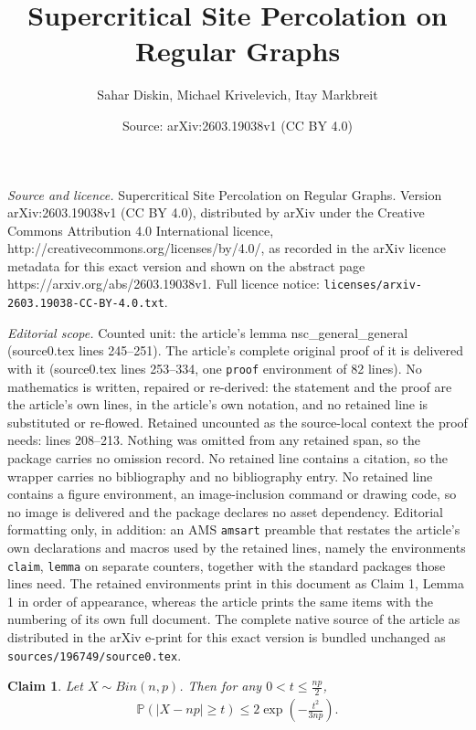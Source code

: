 \documentclass[10pt,a4paper]{amsart}
\title{\vspace{-1.5cm}Supercritical Site Percolation on Regular Graphs}
\author{Sahar Diskin, Michael Krivelevich, Itay Markbreit}
\date{Source: arXiv:2603.19038v1 (CC BY 4.0)}
\newtheorem{claim}{Claim}
\begin{document}
\maketitle

\noindent\emph{Source and licence.} \vspace{-1.5cm}Supercritical Site Percolation on Regular Graphs. Version arXiv:2603.19038v1 (CC BY 4.0), distributed by arXiv under the Creative Commons Attribution 4.0 International licence, http://creativecommons.org/licenses/by/4.0/, as recorded in the arXiv licence metadata for this exact version and shown on the abstract page https://arxiv.org/abs/2603.19038v1. Full licence notice: \texttt{licenses/arxiv-2603.19038-CC-BY-4.0.txt}.\par\smallskip

\noindent\textit{Editorial scope.} Counted unit: the article's lemma nsc\_general\_general (source0.tex lines 245--251). The article's complete original proof of it is delivered with it (source0.tex lines 253--334, one \texttt{proof} environment of 82 lines). No mathematics is written, repaired or re-derived: the statement and the proof are the article's own lines, in the article's own notation, and no retained line is substituted or re-flowed.  Retained uncounted as the source-local context the proof needs: lines 208--213.  Nothing was omitted from any retained span, so the package carries no omission record.  No retained line contains a citation, so the wrapper carries no bibliography and no bibliography entry.  No retained line contains a figure environment, an image-inclusion command or drawing code, so no image is delivered and the package declares no asset dependency.  Editorial formatting only, in addition: an AMS \texttt{amsart} preamble that restates the article's own declarations and macros used by the retained lines, namely the environments \texttt{claim}, \texttt{lemma} on separate counters, together with the standard packages those lines need.  The retained environments print in this document as Claim 1, Lemma 1 in order of appearance, whereas the article prints the same items with the numbering of its own full document.  The complete native source of the article as distributed in the arXiv e-print for this exact version is bundled unchanged as \texttt{sources/196749/source0.tex}.
\begin{claim} \label{cher}
    Let $X\sim Bin(n,p)$. Then for any $0<t\leq \frac{np}{2}$,
    \begin{align*}
        \mathbb{P}(|X-np|\geq t)\leq 2\exp \left(-\frac{t^2}{3np}\right).
    \end{align*}
\end{claim}
\end{document}
